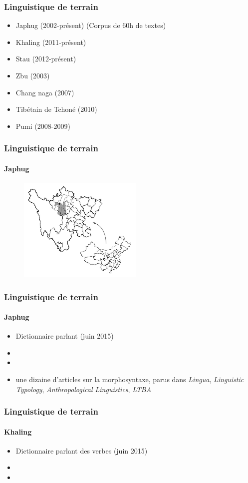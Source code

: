 \documentclass[xcolor=table]{beamer}
\begin{document}
   \begin{frame} 
 \frametitle{Linguistique de terrain} 
 \begin{itemize}%
\item Japhug (2002-présent) (Corpus de 60h de textes)
\item Khaling (2011-présent)
\item Stau (2012-présent)
\item Zbu (2003)
\item Chang naga (2007)
\item Tibétain de Tchoné (2010) 
\item Pumi (2008-2009)
\end{itemize}
   \end{frame} 
   
      \begin{frame} 
 \frametitle{Linguistique de terrain} 
  \framesubtitle{Japhug} 
    \begin{figure}[H]
\centering
\includegraphics[height=50mm]{carte.JPG}
\end{figure}   
       \end{frame} 
       
      \begin{frame} 
 \frametitle{Linguistique de terrain} 
  \framesubtitle{Japhug} 
 \begin{itemize}%
\item Dictionnaire parlant (juin 2015)
\item {}  
\item {}
\item une dizaine d'articles sur la morphosyntaxe, parus dans \textit{Lingua}, \textit{Linguistic Typology}, \textit{Anthropological Linguistics}, \textit{LTBA}
\end{itemize}
    \end{frame} 
    
      \begin{frame} 
 \frametitle{Linguistique de terrain} 
  \framesubtitle{Khaling} 
  \begin{itemize}%
\item Dictionnaire parlant des verbes (juin 2015)
\item {}  
\item {}
\end{itemize}
    \end{frame} 
    
\end{document}
